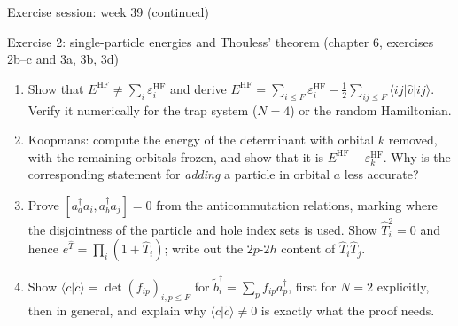 \documentclass[aspectratio=169,10pt]{beamer}
\newcommand{\braket}[2]{\langle #1\vert #2\rangle}
\newcommand{\element}[3]{\langle #1\vert #2\vert #3\rangle}
\begin{document}
\begin{frame}{Exercise session: week 39 (continued)}
  \footnotesize
  \begin{block}{Exercise 2: single-particle energies and Thouless' theorem (chapter 6, exercises 2b--c and 3a, 3b, 3d)}
    \begin{enumerate}
      \item[a)] Show that $E^{\mathrm{HF}}\ne\sum_i\varepsilon_i^{\mathrm{HF}}$ and derive $E^{\mathrm{HF}}=\sum_{i\le F}\varepsilon_i^{\mathrm{HF}}-\frac12\sum_{ij\le F}\element{ij}{\hat{v}}{ij}$. Verify it numerically for the trap system ($N=4$) or the random Hamiltonian.
      \item[b)] Koopmans: compute the energy of the determinant with orbital $k$ removed, with the remaining orbitals frozen, and show that it is $E^{\mathrm{HF}}-\varepsilon_k^{\mathrm{HF}}$. Why is the corresponding statement for \emph{adding} a particle in orbital $a$ less accurate?
      \item[c)] Prove $[a_a^{\dagger}a_i,a_b^{\dagger}a_j]=0$ from the anticommutation relations, marking where the disjointness of the particle and hole index sets is used. Show $\hat{T}_i^2=0$ and hence $e^{\hat{T}}=\prod_i(1+\hat{T}_i)$; write out the $2p$-$2h$ content of $\hat{T}_i\hat{T}_j$.
      \item[d)] Show $\braket{c}{\tilde{c}}=\det(f_{ip})_{i,p\le F}$ for $\tilde{b}_i^{\dagger}=\sum_pf_{ip}a_p^{\dagger}$, first for $N=2$ explicitly, then in general, and explain why $\braket{c}{\tilde{c}}\ne0$ is exactly what the proof needs.
    \end{enumerate}
  \end{block}
\end{frame}
\end{document}
